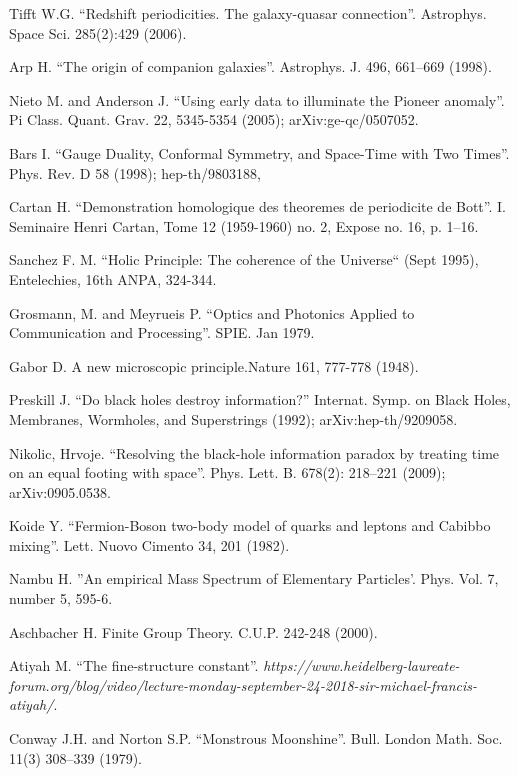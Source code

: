 \documentclass[twoside,draft]{article}
\begin{document}
\begin{sloppypar}
\begin{thebibliography}{99}
 Tifft W.G. ``Redshift periodicities. The galaxy-quasar
connection''. Astrophys. Space Sci. 285(2):429 (2006).

 Arp H. ``The origin of companion galaxies''. Astrophys. J. 496,
661--669 (1998).

 Nieto M. and Anderson J. ``Using early data to illuminate the
Pioneer anomaly''. Pi Class. Quant. Grav. 22, 5345-5354 (2005);
arXiv:ge-qc/0507052.

 Bars I. ``Gauge Duality, Conformal Symmetry, and Space-Time with
Two Times''. Phys. Rev. D 58 (1998); hep-th/9803188, 

 Cartan H. ``Demonstration homologique des theoremes de periodicite
de Bott''. I. Seminaire Henri Cartan, Tome 12 (1959-1960) no. 2, Expose no. 16,
p. 1--16.

 Sanchez F. M. ``Holic Principle: The coherence of the Universe`` (Sept 1995), Entelechies, 16th ANPA, 324-344.

 Grosmann, M. and Meyrueis P. ``Optics and Photonics Applied to Communication and Processing''. SPIE.  Jan 1979.

 Gabor D. A new microscopic principle.Nature 161, 777-778 (1948). 

 Preskill J. ``Do black holes destroy information?'' Internat.
Symp. on Black Holes, Membranes, Wormholes, and Superstrings (1992);
arXiv:hep-th/9209058.

 Nikolic, Hrvoje. ``Resolving the black-hole information paradox by
treating time on an equal footing with space''. Phys. Lett. B. 678(2):
218--221 (2009); arXiv:0905.0538.

 Koide Y. ``Fermion-Boson two-body model of quarks and leptons and
Cabibbo mixing''.  Lett. Nuovo Cimento 34, 201 (1982).

 Nambu H. ''An empirical Mass Spectrum of Elementary Particles'. Phys. Vol. 7, number 5, 595-6.

 Aschbacher H. Finite Group Theory. C.U.P. 242-248 (2000). 

 Atiyah M. ``The fine-structure constant''. {\it https://www.heidelberg-laureate-forum.org/blog/video/lecture-monday-september-24-2018-sir-michael-francis-atiyah/}.

 Conway J.H. and Norton S.P. ``Monstrous Moonshine''. Bull. London
Math. Soc. 11(3) 308--339 (1979).


\end{thebibliography}
\end{sloppypar}
\end{document}
